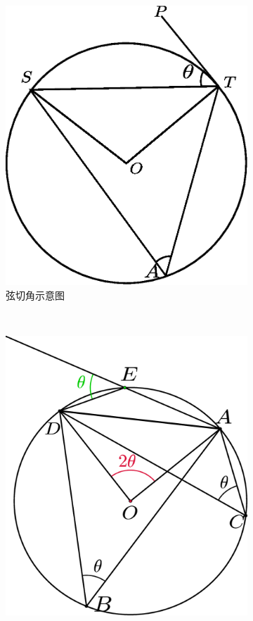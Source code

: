 \documentclass{article}
\begin{document}
\begin{enumerate}
\begin{figure}[!ht]
\begin{subfigure}[b]{0.45\textwidth}
    \includegraphics[width=\textwidth]{Inscribed_angle_theorem4.eps}
    \caption{弦切角示意图}\label{fig:Inscribed_angle_theorem4}
    \end{subfigure}~
    \begin{subfigure}[b]{0.45\textwidth}
    \includegraphics[width=\textwidth]{Inscribed_angles2.eps}

\end{subfigure}
\end{figure}
\end{enumerate}
\end{document}
